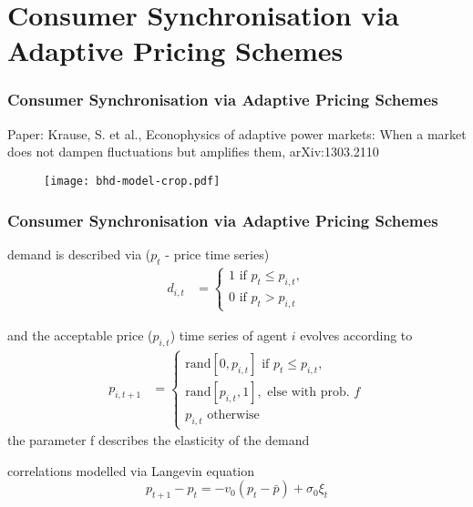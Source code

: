 \documentclass[10pt,dvipsnames]{beamer}
\begin{document}
 \section{Consumer Synchronisation via Adaptive Pricing Schemes}
\begin{frame}
  \frametitle{Consumer Synchronisation via Adaptive Pricing Schemes}

  Paper: Krause, S. et al., Econophysics of adaptive power markets: When a market does not dampen fluctuations but amplifies them, arXiv:1303.2110
    \begin{figure}
     \texttt{[image: bhd-model-crop.pdf]}
  \end{figure}
  \end{frame}
\begin{frame}
  \frametitle{Consumer Synchronisation via Adaptive Pricing Schemes}


demand is described via ($p_t$ - price time series)
\begin{align*}
 d_{i,t} &= \begin{cases}
1 \text{ if } p_t \leq p_{i,t},\\
0 \text{ if } p_t > p_{i,t}
\end{cases}
\end{align*}

and the acceptable price ($p_{i,t}$) time series of agent $i$ evolves according to
\begin {align*}
 p_{i,t+1} &= \begin{cases}
\text{rand}[0,p_{i,t}] \text{ if } p_t \leq p_{i,t},\\
\text{rand}[p_{i,t},1], \text{ else with prob. } f\\
p_{i,t} \text{ otherwise }
\end{cases}
\end {align*}
the parameter f describes the elasticity of the demand


correlations modelled via Langevin equation
\begin{equation*}
p_{t+1} - p_t = -v_0 (p_t - \bar{p}) + \sigma_0 \xi_t
\end{equation*}



\end{frame}
\end{document}
